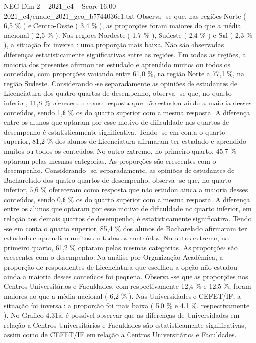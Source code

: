 \begin{textsample}{NEG Dim 2 – 2021\_c4 – Score 16.00 – 2021\_c4/enade\_2021\_geo\_b7744036e1.txt}
Observa -se que, nas regiões Norte ( 6,5 \% ) e Centro-Oeste ( 3,4 \% ), as proporções foram maiores do que a média nacional ( 2,5 \% ).
Nas regiões Nordeste ( 1,7 \% ), Sudeste ( 2,4 \% ) e Sul ( 2,3 \% ), a situação foi inversa : uma proporção mais baixa.
Não são observadas diferenças estatisticamente significativas entre as regiões.
Em todas as regiões, a maioria dos presentes afirmou ter estudado e aprendido muitos ou todos os conteúdos, com proporções variando entre 61,0 \%, na região Norte a 77,1 \%, na região Sudeste.
Considerando -se separadamente as opiniões de estudantes de Licenciatura dos quatro quartos de desempenho, observa -se que, no quarto inferior, 11,8 \% ofereceram como resposta que não estudou ainda a maioria desses conteúdos, sendo 1,6 \% os do quarto superior com a mesma resposta.
A diferença entre os alunos que optaram por esse motivo de dificuldade nos quartos de desempenho é estatisticamente significativa.
Tendo -se em conta o quarto superior, 81,2 \% dos alunos de Licenciatura afirmaram ter estudado e aprendido muitos ou todos os conteúdos.
No outro extremo, no primeiro quarto, 45,7 \% optaram pelas mesmas categorias.
As proporções são crescentes com o desempenho.
Considerando -se, separadamente, as opiniões de estudantes de Bacharelado dos quatro quartos de desempenho, observa -se que, no quarto inferior, 5,6 \% ofereceram como resposta que não estudou ainda a maioria desses conteúdos, sendo 0,6 \% os do quarto superior com a mesma resposta.
A diferença entre os alunos que optaram por esse motivo de dificuldade no quarto inferior, em relação aos demais quartos de desempenho, é estatisticamente significativa.
Tendo -se em conta o quarto superior, 85,4 \% dos alunos de Bacharelado afirmaram ter estudado e aprendido muitos ou todos os conteúdos.
No outro extremo, no primeiro quarto, 61,2 \% optaram pelas mesmas categorias.
As proporções são crescentes com o desempenho.
Na análise por Organização Acadêmica, a proporção de respondentes de Licenciatura que escolheu a opção não estudou ainda a maioria desses conteúdos foi pequena.
Observa -se que as proporções nos Centros Universitários e Faculdades, com respectivamente 12,4 \% e 12,5 \%, foram maiores do que a média nacional ( 6,2 \% ).
Nas Universidades e CEFET/IF, a situação foi inversa : a proporção foi mais baixa ( 5,0 \% e 4,1 \%, respectivamente ).
No Gráfico 4.31a, é possível observar que as diferenças de Universidades em relação a Centros Universitários e Faculdades são estatisticamente significativas, assim como de CEFET/IF em relação a Centros Universitários e Faculdades.

\end{textsample}
